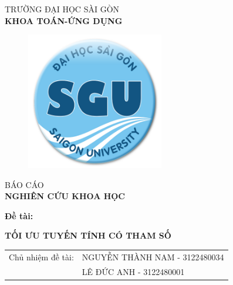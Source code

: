 \documentclass{article}
\begin{document}
 \large
\begin{titlepage}
    \begin{center}
        \vspace{-15pt} TRƯỜNG ĐẠI HỌC SÀI GÒN\\
        \textbf{\fontsize{16pt}{0pt}\selectfont KHOA TOÁN-ỨNG DỤNG}
        \vspace{0.5cm}
        \begin{figure}[H]
            \centering
            \includegraphics[width=6cm,height=6cm]{imge/logodhsg.png}
        \end{figure}
        \vspace{1.5cm}
        \fontsize{28pt}{0pt}\selectfont BÁO CÁO\\
        \vspace{12pt}
        \textbf{\fontsize{32pt}{0pt}\selectfont NGHIÊN CỨU KHOA HỌC}
        \vspace{1.5cm}
        \end{center}
        \begin{center}
        \hspace{15pt}\textbf{\fontsize{30pt}{0pt}\selectfont Đề tài:}
        \begin{center}
        \textbf{\fontsize{20pt}{0pt}\selectfont TỐI ƯU TUYẾN TÍNH CÓ THAM SỐ} 
        \end{center}
        \vspace{-0.5cm}
        \begin{table}[H]
            \centering
            \begin{tabular}{l l}
        \fontsize{14pt}{0pt}\selectfont Chủ nhiệm đề tài:     & \fontsize{14pt}{0pt}\selectfont NGUYỄN THÀNH NAM - 3122480034 \vspace{6pt}\\     
          & \fontsize{14pt}{0pt}\selectfont LÊ ĐỨC ANH - 3122480001 \vspace{6pt}\\
       

\end{tabular}
\end{table}
\end{center}
\end{titlepage}
\end{document}
